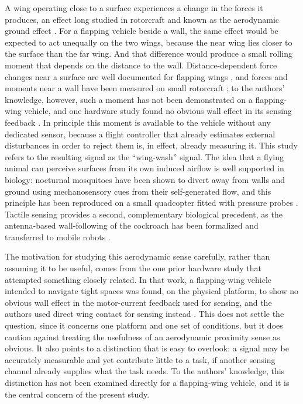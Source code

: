 \documentclass[final,5p,times]{elsarticle}
\begin{document}
A wing operating close to a surface experiences a change in the forces it produces, an effect long studied in rotorcraft and known as the aerodynamic ground effect \cite{cheeseman1959effect, leishman2006principles, sanchez2017characterization}. For a flapping vehicle beside a wall, the same effect would be expected to act unequally on the two wings, because the near wing lies closer to the surface than the far wing. And that difference would produce a small rolling moment that depends on the distance to the wall. Distance-dependent force changes near a surface are well documented for flapping wings \cite{maeda2013ground, lu2016ground}, and forces and moments near a wall have been measured on small rotorcraft \cite{franzetti2024ground}; to the authors' knowledge, however, such a moment has not been demonstrated on a flapping-wing vehicle, and one hardware study found no obvious wall effect in its sensing feedback \cite{tu2019acting}. In principle this moment is available to the vehicle without any dedicated sensor, because a flight controller that already estimates external disturbances in order to reject them is, in effect, already measuring it. This study refers to the resulting signal as the ``wing-wash'' signal. The idea that a flying animal can perceive surfaces from its own induced airflow is well supported in biology: nocturnal mosquitoes have been shown to divert away from walls and ground using mechanosensory cues from their self-generated flow, and this principle has been reproduced on a small quadcopter fitted with pressure probes \cite{nakata2020aerodynamic}. Tactile sensing provides a second, complementary biological precedent, as the antenna-based wall-following of the cockroach has been formalized and transferred to mobile robots \cite{lee2008templates}.

The motivation for studying this aerodynamic sense carefully, rather than assuming it to be useful, comes from the one prior hardware study that attempted something closely related. In that work, a flapping-wing vehicle intended to navigate tight spaces was found, on the physical platform, to show no obvious wall effect in the motor-current feedback used for sensing, and the authors used direct wing contact for sensing instead \cite{tu2019acting}. This does not settle the question, since it concerns one platform and one set of conditions, but it does caution against treating the usefulness of an aerodynamic proximity sense as obvious. It also points to a distinction that is easy to overlook: a signal may be accurately measurable and yet contribute little to a task, if another sensing channel already supplies what the task needs. To the authors' knowledge, this distinction has not been examined directly for a flapping-wing vehicle, and it is the central concern of the present study.
\end{document}
